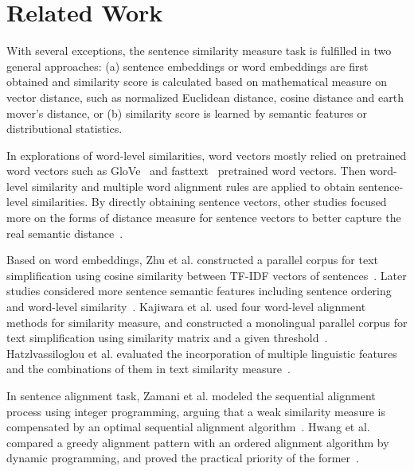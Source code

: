 \section{Related Work}
\label{sec:related}

With several exceptions, the sentence similarity measure task is fulfilled in two general approaches: (a) sentence embeddings or word embeddings are first obtained and similarity score is calculated based on mathematical measure on vector distance, such as normalized Euclidean distance, cosine distance and earth mover's distance, or (b) similarity score is learned by semantic features or distributional statistics.

In explorations of word-level similarities, word vectors mostly relied on pretrained word vectors such as GloVe~\cite{pennington2014glove} and fasttext~\cite{joulin2017bag} pretrained word vectors. Then word-level similarity and multiple word alignment rules are applied to obtain sentence-level similarities. By directly obtaining sentence vectors, other studies focused more on the forms of distance measure for sentence vectors to better capture the real semantic distance~\cite{kajiwara2016building}.

Based on word embeddings, Zhu et al. constructed a parallel corpus for text simplification using cosine similarity between TF-IDF vectors of sentences~\cite{zhu2010monolingual}. Later studies considered more sentence semantic features including sentence ordering~\cite{coster2011learning} and word-level similarity~\cite{hwang2015aligning}. Kajiwara et al. used four word-level alignment methods for similarity measure, and constructed a monolingual parallel corpus for text simplification using similarity matrix and a given threshold~\cite{kajiwara2016building}. Hatzlvassiloglou et al. evaluated the incorporation of multiple linguistic features and the combinations of them in text similarity measure~\cite{hatzlvassiloglou1999detecting}.

In sentence alignment task, Zamani et al. modeled the sequential alignment process using integer programming, arguing that a weak similarity measure is compensated by an optimal sequential alignment algorithm~\cite{zamani2016sentence}. Hwang et al. compared a greedy alignment pattern with an ordered alignment algorithm by dynamic programming, and proved the practical priority of the former~\cite{hwang2015aligning}.


